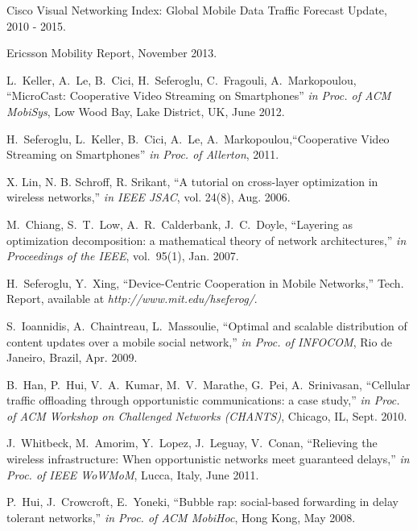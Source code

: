 \documentclass[conference]{IEEEtran}
\begin{document}

\begin{thebibliography}{}


 Cisco Visual Networking Index: Global Mobile Data Traffic Forecast Update, 2010 - 2015.

 Ericsson Mobility Report, November 2013.





 L.~Keller, A.~Le, B.~Cici, H.~Seferoglu, C.~Fragouli, A.~Markopoulou, ``MicroCast: Cooperative Video Streaming on Smartphones'' {\em in Proc. of ACM MobiSys}, Low Wood Bay, Lake District, UK, June 2012.

 H.~Seferoglu, L.~Keller, B.~Cici, A.~Le, A.~Markopoulou,``Cooperative Video Streaming on Smartphones'' {\em in Proc. of Allerton}, 2011.

 X. Lin, N. B. Schroff, R. Srikant, ``A tutorial on cross-layer optimization in wireless networks,'' {\em in IEEE JSAC}, vol. 24(8), Aug. 2006.

 M.~Chiang, S.~T.~Low, A.~R.~Calderbank, J.~C.~Doyle, ``Layering as optimization decomposition: a mathematical theory of network architectures,'' \emph{in Proceedings of the IEEE}, vol.~95(1), Jan. 2007.


 H.~Seferoglu, Y.~Xing, ``Device-Centric Cooperation in Mobile Networks,'' Tech. Report, available at {\em http://www.mit.edu/{\texttildelow}hseferog/}.

 S.~Ioannidis, A.~Chaintreau, L.~Massoulie, ``Optimal and scalable distribution of content updates over a mobile social network,'' {\em in Proc. of INFOCOM}, Rio de Janeiro, Brazil, Apr. 2009.

 B.~Han, P.~Hui, V.~A.~Kumar, M.~V.~Marathe, G.~Pei, A.~Srinivasan, ``Cellular traffic offloading through opportunistic communications: a case study,'' {\em in Proc. of ACM Workshop on Challenged Networks (CHANTS)}, Chicago, IL, Sept. 2010.

 J.~Whitbeck, M.~Amorim, Y.~Lopez, J.~Leguay, V.~Conan, ``Relieving the wireless infrastructure: When opportunistic networks meet guaranteed delays,'' {\em in Proc. of IEEE WoWMoM}, Lucca, Italy, June 2011.

 P.~Hui, J.~Crowcroft, E.~Yoneki, ``Bubble rap: social-based forwarding in delay tolerant networks,'' {\em in Proc. of ACM MobiHoc}, Hong Kong, May 2008.


\end{thebibliography}
\end{document}
